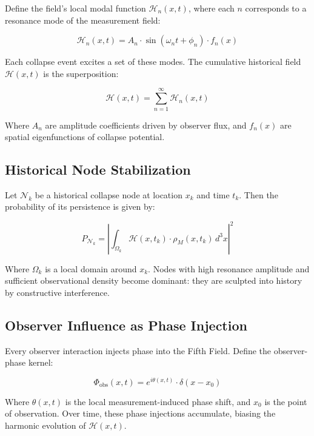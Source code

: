 Define the field's local modal function \( \mathcal{H}_n(x,t) \), where each \( n \) corresponds to a resonance mode of the measurement field:

\begin{equation}
\mathcal{H}_n(x,t) = A_n \cdot \sin\left( \omega_n t + \phi_n \right) \cdot f_n(x)
\end{equation}

Each collapse event excites a set of these modes. The cumulative historical field \( \mathcal{H}(x,t) \) is the superposition:

\begin{equation}
\mathcal{H}(x,t) = \sum_{n=1}^\infty \mathcal{H}_n(x,t)
\end{equation}

Where \( A_n \) are amplitude coefficients driven by observer flux, and \( f_n(x) \) are spatial eigenfunctions of collapse potential.

\subsection{Historical Node Stabilization}

Let \( \mathcal{N}_k \) be a historical collapse node at location \( x_k \) and time \( t_k \). Then the probability of its persistence is given by:

\begin{equation}
P_{\mathcal{N}_k} = \left| \int_{\Omega_k} \mathcal{H}(x,t_k) \cdot \rho_M(x,t_k) \, d^3x \right|^2
\end{equation}

Where \( \Omega_k \) is a local domain around \( x_k \). Nodes with high resonance amplitude and sufficient observational density become dominant: they are sculpted into history by constructive interference.

\subsection{Observer Influence as Phase Injection}

Every observer interaction injects phase into the Fifth Field. Define the observer-phase kernel:

\begin{equation}
\Phi_{\text{obs}}(x,t) = e^{i \theta(x,t)} \cdot \delta(x - x_0)
\end{equation}

Where \( \theta(x,t) \) is the local measurement-induced phase shift, and \( x_0 \) is the point of observation. Over time, these phase injections accumulate, biasing the harmonic evolution of \( \mathcal{H}(x,t) \).

